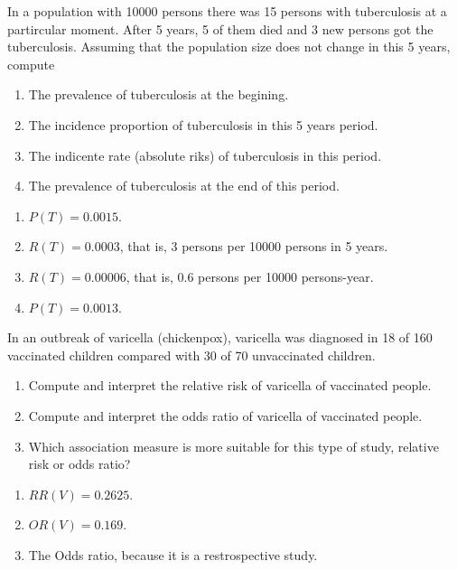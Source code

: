 {In a population with 10000 persons there was 15 persons with tuberculosis at a partircular moment. 
After 5 years, 5 of them died and 3 new persons got the tuberculosis. 
Assuming that the population size does not change in this 5 years, compute
\begin{enumerate}
\item The prevalence of tuberculosis at the begining.
\item The incidence proportion of tuberculosis in this 5 years period. 
\item The indicente rate (absolute riks) of tuberculosis in this period. 
\item The prevalence of tuberculosis at the end of this period.
\end{enumerate} 
}
{
\begin{enumerate}
\item $P(T)=0.0015$.
\item $R(T)=0.0003$, that is, 3 persons per 10000 persons in 5 years.
\item $R(T)=0.00006$, that is, $0.6$ persons per 10000 persons-year. 
\item $P(T)=0.0013$.
\end{enumerate}
}
{}


{In an outbreak of varicella (chickenpox), varicella was diagnosed in 18 of 160 vaccinated children compared with 30 of 70 unvaccinated children.
\begin{enumerate}
\item Compute and interpret the relative risk of varicella of vaccinated people.
\item Compute and interpret the odds ratio of varicella of vaccinated people.
\item Which association measure is more suitable for this type of study, relative risk or odds ratio?
\end{enumerate}
}
{
\begin{enumerate}
\item $RR(V)=0.2625$.
\item $OR(V)=0.169$.
\item The Odds ratio, because it is a restrospective study.
\end{enumerate}
}
{}



